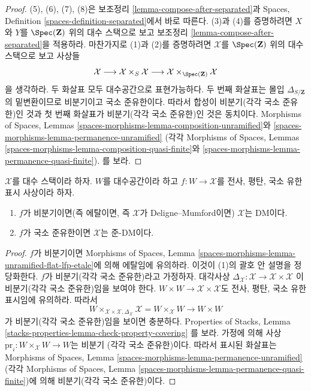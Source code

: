 \begin{proof}
(5), (6), (7), (8)은 보조정리
\ref{lemma-compose-after-separated}과
Spaces, Definition \ref{spaces-definition-separated}에서 바로 따른다.
(3)과 (4)를 증명하려면 $X$와 $Y$를 $\Spec(\mathbf{Z})$ 위의
대수 스택으로 보고 보조정리 \ref{lemma-compose-after-separated}을
적용하라. 마찬가지로 (1)과 (2)를 증명하려면 $\mathcal{X}$를
$\Spec(\mathbf{Z})$ 위의 대수 스택으로 보고 사상들
$$
\mathcal{X} \longrightarrow
\mathcal{X} \times_S \mathcal{X} \longrightarrow
\mathcal{X} \times_{\Spec(\mathbf{Z})} \mathcal{X}
$$
을 생각하라. 두 화살표 모두 대수공간으로 표현가능하다.
두 번째 화살표는 몰입 $\Delta_{S/\mathbf{Z}}$의 밑변환이므로
비분기이고 국소 준유한이다. 따라서 합성이 비분기(각각 국소 준유한)인 것과
첫 번째 화살표가 비분기(각각 국소 준유한)인 것은 동치이다.
Morphisms of Spaces, Lemmas
\ref{spaces-morphisms-lemma-composition-unramified}와
\ref{spaces-morphisms-lemma-permanence-unramified}
(각각 Morphisms of Spaces, Lemmas
\ref{spaces-morphisms-lemma-composition-quasi-finite}와
\ref{spaces-morphisms-lemma-permanence-quasi-finite}).
를 보라.
\end{proof}

\begin{lemma}
\label{lemma-properties-covering-imply-diagonal}
$\mathcal{X}$를 대수 스택이라 하자. $W$를 대수공간이라 하고
$f : W \to \mathcal{X}$를 전사, 평탄, 국소 유한 표시 사상이라 하자.
\begin{enumerate}
\item $f$가 비분기이면(즉 에탈이면, 즉 $\mathcal{X}$가
Deligne--Mumford이면) $\mathcal{X}$는 DM이다.
\item $f$가 국소 준유한이면 $\mathcal{X}$는 준-DM이다.
\end{enumerate}
\end{lemma}

\begin{proof}
$f$가 비분기이면 Morphisms of Spaces, Lemma
\ref{spaces-morphisms-lemma-unramified-flat-lfp-etale}에 의해 에탈임에
유의하라. 이것이 (1)의 괄호 안 설명을 정당화한다.
$f$가 비분기(각각 국소 준유한)라고 가정하자. 대각사상
$\Delta_\mathcal{X} : \mathcal{X} \to \mathcal{X} \times \mathcal{X}$
이 비분기(각각 국소 준유한)임을 보여야 한다.
$W \times W \to \mathcal{X} \times \mathcal{X}$도 전사, 평탄,
국소 유한 표시임에 유의하라. 따라서
$$
W \times_{\mathcal{X} \times \mathcal{X}, \Delta_\mathcal{X}} \mathcal{X}
=
W \times_\mathcal{X} W
\longrightarrow
W \times W
$$
가 비분기(각각 국소 준유한)임을 보이면 충분하다.
Properties of Stacks, Lemma
\ref{stacks-properties-lemma-check-property-covering}
를 보라. 가정에 의해 사상
$\text{pr}_i : W \times_\mathcal{X} W \to W$는 비분기
(각각 국소 준유한)이다. 따라서 표시된 화살표는
Morphisms of Spaces, Lemma
\ref{spaces-morphisms-lemma-permanence-unramified}
(각각 Morphisms of Spaces, Lemma
\ref{spaces-morphisms-lemma-permanence-quasi-finite})에 의해
비분기(각각 국소 준유한)이다.
\end{proof}

